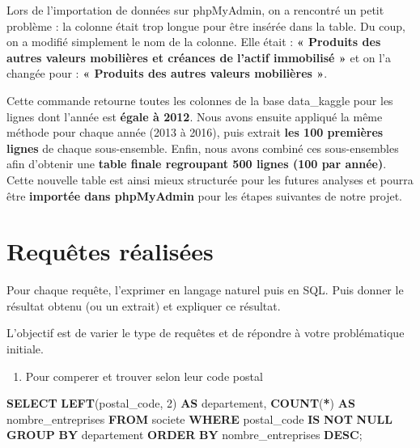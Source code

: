 \documentclass[mstat,12pt]{unswthesis}
\newenvironment{Shaded}{\begin{snugshade}}{\end{snugshade}}
\newcommand{\DecValTok}[1]{\textcolor[rgb]{0.00,0.00,0.81}{#1}}
\newcommand{\FunctionTok}[1]{\textcolor[rgb]{0.13,0.29,0.53}{\textbf{#1}}}
\newcommand{\KeywordTok}[1]{\textcolor[rgb]{0.13,0.29,0.53}{\textbf{#1}}}
\newcommand{\NormalTok}[1]{#1}
\newcommand{\OperatorTok}[1]{\textcolor[rgb]{0.81,0.36,0.00}{\textbf{#1}}}
\begin{document}
\medskip

Lors de l'importation de données sur phpMyAdmin, on a rencontré un petit
problème : la colonne était trop longue pour être insérée dans la table.
Du coup, on a modifié simplement le nom de la colonne. Elle était :
\textbf{« Produits des autres valeurs mobilières et créances de l'actif
immobilisé » } et on l'a changée pour : \textbf{« Produits des autres
valeurs mobilières »}.

\medskip

Cette commande retourne toutes les colonnes de la base data\_kaggle pour
les lignes dont l'année est \textbf{égale à 2012}. Nous avons ensuite
appliqué la même méthode pour chaque année (2013 à 2016), puis extrait
\textbf{les 100 premières lignes} de chaque sous-ensemble. Enfin, nous
avons combiné ces sous-ensembles afin d'obtenir une \textbf{table finale
regroupant 500 lignes (100 par année)}. Cette nouvelle table est ainsi
mieux structurée pour les futures analyses et pourra être
\textbf{importée dans phpMyAdmin} pour les étapes suivantes de notre
projet.

\newpage

\newpage

\section{Requêtes réalisées}\label{requuxeates-ruxe9alisuxe9es}

Pour chaque requête, l'exprimer en langage naturel puis en SQL. Puis
donner le résultat obtenu (ou un extrait) et expliquer ce résultat.

L'objectif est de varier le type de requêtes et de répondre à votre
problématique initiale.

\begin{enumerate}
\def\labelenumi{\arabic{enumi})}
\tightlist
\item
  Pour comperer et trouver selon leur code postal
\end{enumerate}

\begin{Shaded}
\begin{Highlighting}[]

\KeywordTok{SELECT} 
    \KeywordTok{LEFT}\NormalTok{(postal\_code, }\DecValTok{2}\NormalTok{) }\KeywordTok{AS}\NormalTok{ departement,}
    \FunctionTok{COUNT}\NormalTok{(}\OperatorTok{*}\NormalTok{) }\KeywordTok{AS}\NormalTok{ nombre\_entreprises}
\KeywordTok{FROM} 
\NormalTok{    societe}
\KeywordTok{WHERE} 
\NormalTok{    postal\_code }\KeywordTok{IS} \KeywordTok{NOT} \KeywordTok{NULL}
\KeywordTok{GROUP} \KeywordTok{BY} 
\NormalTok{    departement}
\KeywordTok{ORDER} \KeywordTok{BY} 
\NormalTok{    nombre\_entreprises }\KeywordTok{DESC}\NormalTok{;}
\end{Highlighting}
\end{Shaded}
\end{document}
